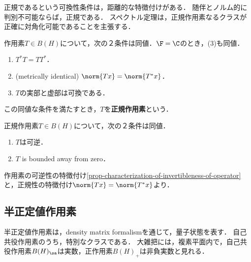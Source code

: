 \documentclass[uplatex,dvipdfmx]{jsreport}
\begin{document}
\begin{tcolorbox}[colframe=ForestGreen, colback=ForestGreen!10!white,breakable,colbacktitle=ForestGreen!40!white,coltitle=black,fonttitle=\bfseries\sffamily,
title=真に$C^*$-代数の性質を特徴づける作用素のクラスである]
    正規であるという可換性条件は，距離的な特徴付けがある．
    随伴とノルム的に判別不可能ならば，正規である．
    スペクトル定理は，正規作用素なるクラスが正確に対角化可能であることを主張する．
\end{tcolorbox}

\begin{definition}[normal]
    作用素$T\in B(H)$について，次の２条件は同値．$\F=\C$のとき，(3)も同値．
    \begin{enumerate}
        \item $T^*T=TT^*$．
        \item (metrically identical) $\norm{Tx}=\norm{T^*x}$．
        \item $T$の実部と虚部は可換である．
    \end{enumerate}
    この同値な条件を満たすとき，$T$を\textbf{正規作用素}という．
\end{definition}

\begin{corollary}[正規作用素の可逆性]\label{prop-characterization-of-invertibleness-of-normal-operator}
    正規作用素$T\in B(H)$について，次の２条件は同値．
    \begin{enumerate}
        \item $T$は可逆．
        \item $T$ is bounded away from zero．
    \end{enumerate}
\end{corollary}
\begin{Proof}
    作用素の可逆性の特徴付け\ref{prop-characterization-of-invertibleness-of-operator}と，正規性の特徴付け$\norm{Tx}=\norm{T^*x}$より．
\end{Proof}

\subsection{半正定値作用素}

\begin{tcolorbox}[colframe=ForestGreen, colback=ForestGreen!10!white,breakable,colbacktitle=ForestGreen!40!white,coltitle=black,fonttitle=\bfseries\sffamily,
title=]
    半正定値作用素は，density matrix formalismを通じて，量子状態を表す．
    自己共役作用素のうち，特別なクラスである．
    大雑把には，複素平面内で，自己共役作用素$B(H)_\sa$は実数，正作用素$B(H)_+$は非負実数と見れる．
\end{tcolorbox}
\end{document}
